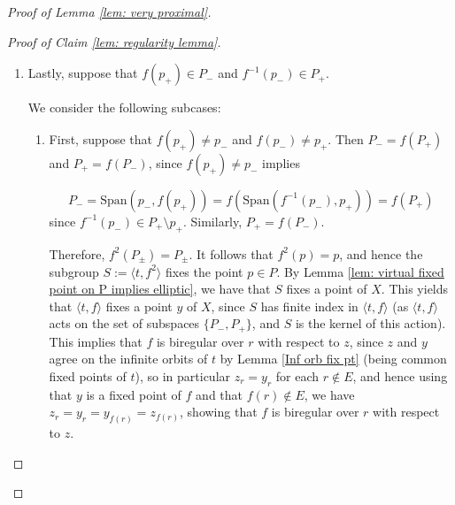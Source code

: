 \documentclass[12pt]{article}
\theoremstyle{definition}
\newcommand{\Span}{\mathrm{Span}}
\begin{document}
\begin{proof} [Proof of Lemma \ref{lem: very proximal}]
\begin{proof}[Proof of Claim \ref{lem: regularity lemma}]
\begin{enumerate}
        Suppose that $(t^N f t^n f)^i$ is biregular over $r$ for some $i < 0$. Then since $t^{-N}(t^N f t^n f)^i(r) \notin B$, and $t^{-N}(t^N f t^n f)^i$ is biregular over $r$, we have that $f^{-1}t^{-N}(t^N f t^n f)^i$ is biregular over $r$, which implies that $t^{-n}f^{-1}t^{-N}(t^N f t^n f)^i$ is biregular over $r$. Since $t^{-n}f^{-1}t^{-N}(t^N f t^n f)^i(r) \notin B$, we have that $f^{-1}$ is biregular over $t^{-n}f^{-1}t^{-N}(t^N f t^n f)^i(r)$ and hence that $(t^N f t^n f)^{i-1} = f^{-1}t^{-n}f^{-1}t^{-N}(t^N f t^n f)^i$ is biregular over $r$. 

        Therefore, $(t^N f t^n f)^i$ has persistent fibre over $r$, contradicting that $\Gamma$ acts purely elliptically on $X$. We conclude that $f$ is biregular over $r$. 
        
    

    
    \item Lastly, suppose that $f(p_+) \in P_-$ and $f^{-1}(p_-) \in P_+$. 

    We consider the following subcases: 

    \begin{enumerate}
        \item First, suppose that $f(p_+) \neq p_-$ and $f(p_-) \neq p_+$. Then $P_- = f(P_+)$ and $P_+ = f(P_-)$, since $f(p_+) \neq p_-$ implies 
        
        $$P_- = \Span(p_-, f(p_+)) = f(\Span(f^{-1}(p_-), p_+)) = f(P_+)$$ 
        since $f^{-1}(p_-) \in P_+ \setminus p_+$. Similarly, $P_+ = f(P_-)$.
        
        Therefore, $f^2(P_{\pm}) = P_\pm$. It follows that $f^2(p) = p$, and hence the subgroup $S:= \langle t,f^2 \rangle$ fixes the point $p \in P$.
        By Lemma \ref{lem: virtual fixed point on P implies elliptic}, we have that $S$ fixes a point of $X$. This yields that $\langle t,f \rangle$ fixes a point $y$ of $X$, since $S$ has finite index in $\langle t, f \rangle$ (as $\langle t,f \rangle$ acts on the set of subspaces $\{P_-, P_+\}$, and $S$ is the kernel of this action). This implies that $f$ is biregular over $r$ with respect to $z$, since $z$ and $y$ agree on the infinite orbits of $t$ by Lemma \ref{Inf orb fix pt} (being common fixed points of $t$), so in particular $z_r = y_r$ for each $r \notin E$, and hence using that $y$ is a fixed point of $f$ and that $f(r) \notin E$, we have $z_r = y_r = y_{f(r)} = z_{f(r)}$, showing that $f$ is biregular over $r$ with respect to $z$.  


\end{enumerate}
\end{enumerate}
\end{proof}
\end{proof}
\end{document}
